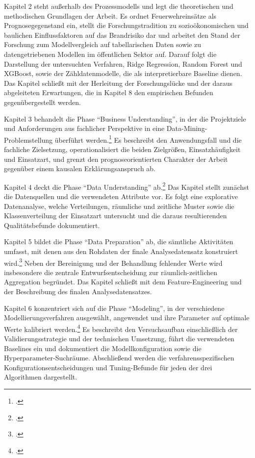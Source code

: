 \documentclass[12pt,a4paper]{article}
\begin{document}
Kapitel 2 steht außerhalb des Prozessmodells und legt die theoretischen und methodischen
Grundlagen der Arbeit. Es ordnet Feuerwehreinsätze als Prognosegegenstand ein, stellt die
Forschungstradition zu sozioökonomischen und baulichen Einflussfaktoren auf das Brandrisiko dar
und arbeitet den Stand der Forschung zum Modellvergleich auf tabellarischen Daten sowie zu
datengetriebenen Modellen im öffentlichen Sektor auf. Darauf folgt die Darstellung der
untersuchten Verfahren, Ridge Regression, Random Forest und XGBoost, sowie der
Zähldatenmodelle, die als interpretierbare Baseline dienen. Das Kapitel schließt mit der
Herleitung der Forschungslücke und der daraus abgeleiteten Erwartungen, die in Kapitel 8 den
empirischen Befunden gegenübergestellt werden.

Kapitel 3 behandelt die Phase \enquote{Business Understanding}, in der die Projektziele und
Anforderungen aus fachlicher Perspektive in eine Data-Mining-Problemstellung überführt
werden.\footcite[5]{Marban2009} Es beschreibt den Anwendungsfall und die fachliche Zielsetzung,
operationalisiert die beiden Zielgrößen, Einsatzhäufigkeit und Einsatzart, und grenzt den
prognoseorientierten Charakter der Arbeit gegenüber einem kausalen Erklärungsanspruch ab.

Kapitel 4 deckt die Phase \enquote{Data Understanding} ab.\footcite[5]{Marban2009} Das Kapitel
stellt zunächst die Datenquellen und die verwendeten Attribute vor. Es folgt eine explorative
Datenanalyse, welche Verteilungen, räumliche und zeitliche Muster sowie die Klassenverteilung der
Einsatzart untersucht und die daraus resultierenden Qualitätsbefunde dokumentiert.

Kapitel 5 bildet die Phase \enquote{Data Preparation} ab, die sämtliche Aktivitäten umfasst, mit
denen aus den Rohdaten der finale Analysedatensatz konstruiert wird.\footcite[6]{Marban2009} Neben
der Bereinigung und der Behandlung fehlender Werte wird insbesondere die zentrale
Entwurfsentscheidung zur räumlich-zeitlichen Aggregation begründet. Das Kapitel schließt mit dem
Feature-Engineering und der Beschreibung des finalen Analysedatensatzes.

Kapitel 6 konzentriert sich auf die Phase \enquote{Modeling}, in der verschiedene
Modellierungsverfahren ausgewählt, angewendet und ihre Parameter auf optimale Werte kalibriert
werden.\footcite[6]{Marban2009} Es beschreibt den Versuchsaufbau einschließlich der
Validierungsstrategie und der technischen Umsetzung, führt die verwendeten Baselines ein und
dokumentiert die Modellkonfiguration sowie die Hyperparameter-Suchräume. Abschließend werden die
verfahrensspezifischen Konfigurationsentscheidungen und Tuning-Befunde für jeden der drei
Algorithmen dargestellt.
\end{document}
